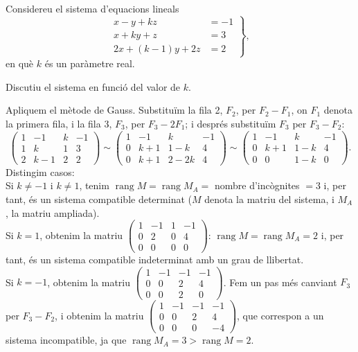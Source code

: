 Considereu el sistema d'equacions lineals
\[
\left.\begin{aligned}
x-y+kz&=-1\\
x+ky+z&=3\\
2x+(k-1)y+2z&=2
\end{aligned}\right\},
\]
en què $k$ és un paràmetre real.

\begin{apartats}

Discutiu el sistema en funció del valor de $k$.

\begin{solucio}
Apliquem el mètode de Gauss. Substituïm la fila 2, $F_2$, per $F_2-F_1$, on $F_1$ denota la primera fila, i la fila
3, $F_3$, per $F_3-2F_1$; i després substituïm $F_3$ per $F_3-F_2$:
\[
\left(\begin{array}{ccc|c}1&-1&k&-1\\1&k&1&3\\2&k-1&2&2\end{array}\right)
\sim\left(\begin{array}{ccc|c}1&-1&k&-1\\0&k+1&1-k&4\\0&k+1&2-2k&4\end{array}\right)
\sim\left(\begin{array}{ccc|c}1&-1&k&-1\\0&k+1&1-k&4\\0&0&1-k&0\end{array}\right).
\]
Distingim casos:\\
Si $k\neq-1$ i $k\neq1$, tenim $\operatorname{rang}M=\operatorname{rang}M_A=$ nombre d'incògnites $=3$ i, per tant, és un
sistema compatible determinat ($M$ denota la matriu del sistema, i $M_A$, la matriu ampliada).\\
Si $k=1$, obtenim la matriu
$\left(\begin{array}{ccc|c}1&-1&1&-1\\0&2&0&4\\0&0&0&0\end{array}\right)$: $\operatorname{rang}M=\operatorname{rang}M_A=2$ i, per
tant, és un sistema compatible indeterminat amb un grau de llibertat.\\
Si $k=-1$, obtenim la matriu
$\left(\begin{array}{ccc|c}1&-1&-1&-1\\0&0&2&4\\0&0&2&0\end{array}\right)$. Fem un pas més canviant $F_3$ per $F_3-F_2$, i
obtenim la matriu $\left(\begin{array}{ccc|c}1&-1&-1&-1\\0&0&2&4\\0&0&0&-4\end{array}\right)$, que correspon a un sistema
incompatible, ja que $\operatorname{rang}M_A=3>\operatorname{rang}M=2$.


\end{solucio}
\end{apartats}
